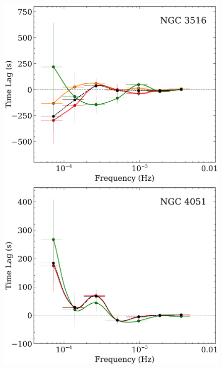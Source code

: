 \documentclass{article}
\begin{document}
\begin{figure}
    \ContinuedFloat
\centering
\includegraphics[scale=0.4]{images/NGC3516-lag-results-lo-hi-flux-FP.pdf}
\includegraphics[scale=0.4]{images/NGC4051-lag-results-lo-hi-flux-FP.pdf}\\
\vspace{0.5cm}

\end{figure}
\end{document}
